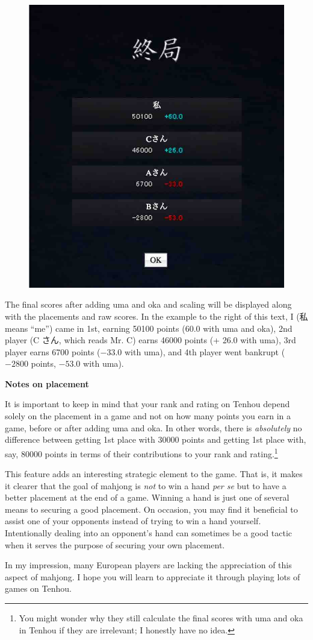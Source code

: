 \begin{figure}
\begin{center}
\includegraphics[width=.4\textwidth,clip]{figs/finalscore.jpg}
\end{center}
\vspace{-25pt}
\end{figure}

\bigskip

The final scores after adding {\jap uma} and {\jap oka} and scaling will be displayed along with the placements and raw scores. In the example to the right of this text, I (私 means ``me'') came in 1st, earning 50100 points (60.0 with {\jap uma} and {\jap oka}), 2nd player (C さん, which reads Mr. C) earns 46000 points (+ 26.0 with {\jap uma}), 3rd player earns 6700 points ($-33.0$ with {\jap uma}), and 4th player went bankrupt ($-2800$ points, $-53.0$ with {\jap uma}).

\newpage

\begin{boxnote} \small
{\bf\normalsize Notes on placement}

\bigskip
It is important to keep in mind that your rank and rating on {\jap Tenhou} depend solely on the placement in a game and not on how many points you earn in a game, before or after adding {\jap uma} and {\jap oka}. In other words, there is \emph{absolutely} no difference between getting 1st place with 30000 points and getting 1st place with, say, 80000 points in terms of their contributions to your rank and rating.\footnote{You might wonder why they still calculate the final scores with {\jap uma} and {\jap oka} in {\jap Tenhou} if they are irrelevant; I honestly have no idea.}

\bigskip
This feature adds an interesting strategic element to the game. That is, it makes it clearer that the goal of mahjong is \emph{not} to win a hand \emph{per se} but to have a better placement at the end of a game. Winning a hand is just one of several means to securing a good placement. On occasion, you may find it beneficial to assist one of your opponents instead of trying to win a hand yourself. Intentionally dealing into an opponent's hand can sometimes be a good tactic when it serves the purpose of securing your own placement.

\bigskip
In my impression, many European players are lacking the appreciation of this aspect of mahjong. I hope you will learn to appreciate it through playing lots of games on {\jap Tenhou}.
\vspace{5pt}
\end{boxnote}

